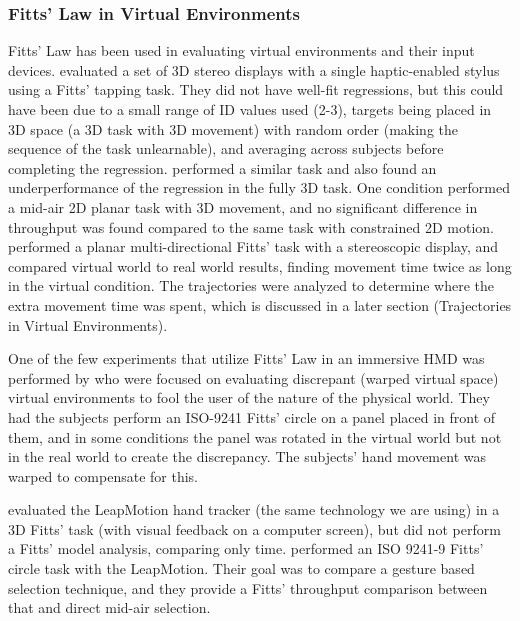 \subsubsection{Fitts' Law in Virtual Environments}\label{applying-fitts-to-virtual-environment}

Fitts' Law has been used in evaluating virtual environments and their input devices.
\citet{chun_evaluating_2004} evaluated a set of 3D stereo displays with a single haptic-enabled stylus using a Fitts' tapping task.
They did not have well-fit regressions, but this could have been due to a small range of ID values used (2-3), targets being placed in 3D space (a 3D task with 3D movement) with random order (making the sequence of the task unlearnable), and averaging across subjects before completing the regression.
\citet{teather_evaluating_2010} performed a similar task and also found an underperformance of the regression in the fully 3D task.
One condition performed a mid-air 2D planar task with 3D movement, and no significant difference in throughput was found compared to the same task with constrained 2D motion.
\citet{liu_comparing_2009} performed a planar multi-directional Fitts' task with a stereoscopic display, and compared virtual world to real world results, finding movement time twice as long in the virtual condition.
The trajectories were analyzed to determine where the extra movement time was spent, which is discussed in a later section (Trajectories in Virtual Environments).

One of the few experiments that utilize Fitts' Law in an immersive HMD was performed by \citet{kohli_redirected_2012} who were focused on evaluating discrepant (warped virtual space) virtual environments to fool the user of the nature of the physical world.
They had the subjects perform an ISO-9241 Fitts' circle on a panel placed in front of them, and in some conditions the panel was rotated in the virtual world but not in the real world to create the discrepancy.
The subjects' hand movement was warped to compensate for this.

\citet{coelho_pointing_2014} evaluated the LeapMotion hand tracker (the same technology we are using) in a 3D Fitts' task (with visual feedback on a computer screen), but did not perform a Fitts' model analysis, comparing only time.
\citet{seixas_one_2015} performed an ISO 9241-9 Fitts' circle task with the LeapMotion.
Their goal was to compare a gesture based selection technique, and they provide a Fitts' throughput comparison between that and direct mid-air selection.


